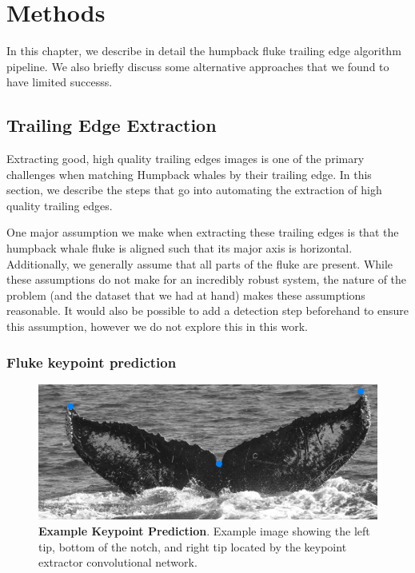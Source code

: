   
\chapter{Methods} \label{sec:methods}

In this chapter, we describe in detail the humpback fluke trailing edge algorithm pipeline.
We also briefly discuss some alternative approaches that we found to have limited successs.

\section{Trailing Edge Extraction}

Extracting good, high quality trailing edges images is one of the primary challenges when matching Humpback whales by their trailing edge.
In this section, we describe the steps that go into automating the extraction of high quality trailing edges.

One major assumption we make when extracting these trailing edges is that the humpback whale fluke is aligned such that its major axis is horizontal.
Additionally, we generally assume that all parts of the fluke are present.
While these assumptions do not make for an incredibly robust system, the nature of the problem (and the dataset that we had at hand) makes these assumptions reasonable.
It would also be possible to add a detection step beforehand to ensure this assumption, however we do not explore this in this work.


\subsection{Fluke keypoint prediction}


\begin{figure}[t]%
\centering
\includegraphics[width=1.0\textwidth]{../images/aid88_kpoverlay.png}
\caption[]{\textbf{Example Keypoint Prediction}. Example image showing the left tip, bottom of the notch, and right tip located by the keypoint extractor convolutional network.}
\label{fig:example_kp}
\end{figure}

